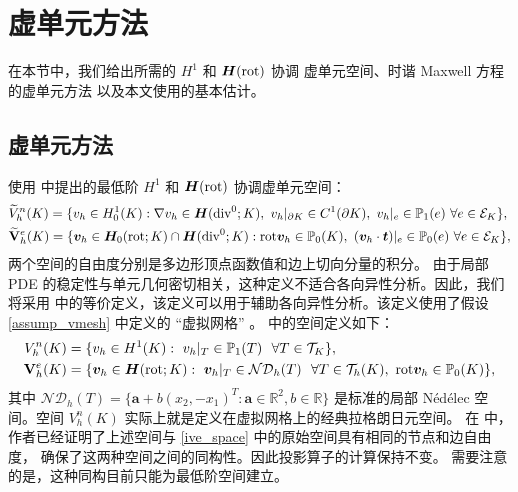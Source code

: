 \section{虚单元方法}
\label{sec:vspace}

在本节中，我们给出所需的 $H^1$ 和 $\boldsymbol{H}(\mathrm{rot})$
协调
虚单元空间、时谐 Maxwell 方程的虚单元方法
以及本文使用的基本估计。

\subsection{虚单元方法}
使用 \cite{BeiraoBrezziCangianiManziniEtAl2013,2016VeigaBrezziMarini} 中提出的最低阶 
$H^1$ 和 $\boldsymbol{H}(\mathrm{rot})$ 协调虚单元空间：
\begin{subequations}
\label{ive_space}
\begin{align}
&   \widetilde{V}^n_h(K) = \{ v_h \in H^1_0(K):  \nabla v_h\in \boldsymbol{H}(\mathrm{div}^0; K), ~ v_h|_{\partial K} \in C^1(\partial K), ~ v_h|_e \in \mathbb{P}_1(e) ~ \forall e\in \mathcal{E}_K \}, \label{ive_space1} \\
&   \widetilde{\mathbf{V}}^e_h(K) = \{ \boldsymbol{v}_h \in \boldsymbol{H}_0(\mathrm{rot};K) \cap \boldsymbol{H}(\mathrm{div}^0;K):  \mathrm{rot} \boldsymbol{v}_h \in \mathbb{P}_0(K), ~ (\boldsymbol{v}_h\cdot\boldsymbol{t})|_e \in \mathbb{P}_0(e) ~ \forall e\in \mathcal{E}_K \}, \label{ive_space2}
\end{align}
\end{subequations}
两个空间的自由度分别是多边形顶点函数值和边上切向分量的积分。
由于局部 PDE
的稳定性与单元几何密切相关，这种定义不适合各向异性分析。因此，我们将采用
\cite{2021CaoChenGuo}
中的等价定义，该定义可以用于辅助各向异性分析。该定义使用了假设
\ref{assump_vmesh} 中定义的 “虚拟网格” 。\cite{2021CaoChenGuo}
中的空间定义如下：
\begin{subequations}
\label{auxi_v_space_1_polygon}
\begin{align}
V^n_h(K) & = \{ v_h \in H^1(K) : ~ v_h|_T\in\mathbb{P}_1(T) ~~ \forall T \in \mathcal{T}_K \},  \label{auxi_v_space_1_polygon1} \\
\mathbf{V}^e_h(K) & = \{ \boldsymbol{v}_h \in \boldsymbol{H}(\mathrm{rot} ;K): ~  \boldsymbol{v}_h|_{T} \in \mathcal{ND}_h(T) ~~ \forall T\in \mathcal T_h(K),
~  \mathrm{rot} \boldsymbol{v}_h \in \mathbb{P}_0(K)\}, \label{auxi_v_space_1_polygon2}
\end{align}
\end{subequations}
其中 $\mathcal{ND}_h(T) = \{\boldsymbol{a} + b(x_2, -x_1)^T : \boldsymbol{a} \in \mathbb{R}^2,
b \in \mathbb{R}\}$ 是标准的局部 N\'ed\'elec 空间。空间 $V^n_h(K)$ 
实际上就是定义在虚拟网格上的经典拉格朗日元空间。
在 \cite{2021CaoChenGuo} 中，作者已经证明了上述空间与 \eqref{ive_space} 
中的原始空间具有相同的节点和边自由度，
确保了这两种空间之间的同构性。因此投影算子的计算保持不变。
需要注意的是，这种同构目前只能为最低阶空间建立。

